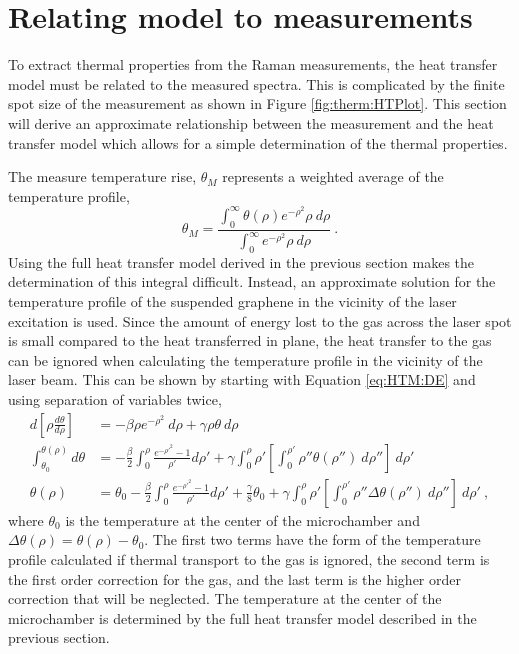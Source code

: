 \section{Relating model to measurements}
To extract thermal properties from the Raman measurements, the heat transfer model must be related to the measured spectra.
This is complicated by the finite spot size of the measurement as shown in Figure \ref{fig:therm:HTPlot}.
This section will derive an approximate relationship between the measurement and the heat transfer model which allows for a simple determination of the thermal properties.

The measure temperature rise, $\theta_M$ represents a weighted average of the temperature profile,
\begin{equation}
	\theta_M=\frac{\int_0^{\infty} \theta(\rho) e^{-\rho^2} \rho \ d \rho}{\int_0^{\infty} e^{-\rho^2} \rho \ d \rho} \ . \label{eq:HTM:average}
\end{equation}
Using the full heat transfer model derived in the previous section makes the determination of this integral difficult.
Instead, an approximate solution for the temperature profile of the suspended graphene in the vicinity of the laser excitation is used.
Since the amount of energy lost to the gas across the laser spot is small compared to the heat transferred in plane, the heat transfer to the gas can be ignored when calculating the temperature profile in the vicinity of the laser beam.
This can be shown by starting with Equation \ref{eq:HTM:DE} and using separation of variables twice,
\begin{align*}
	d \left[\rho \frac{d \theta}{d \rho} \right]&=-\beta \rho e^{-\rho^2} \ d \rho+\gamma \rho \theta \ d \rho \\
	\int_{\theta_0}^{\theta(\rho)} d \theta&=
		-\frac{\beta}{2} \int_0^{\rho}\frac{e^{-\rho'^2}-1}{\rho'} d \rho' + 
		\gamma \int_0^{\rho}\rho' \left[\int_{0}^{\rho'}\rho'' \theta(\rho'') \ d \rho''\right] \ d \rho' \\
	\theta(\rho)&=\theta_0-\frac{\beta}{2} \int_0^{\rho}\frac{e^{-\rho'^2}-1}{\rho'} d \rho'+
		\frac{\gamma}{8} \theta_0 +
		\gamma \int_0^{\rho}\rho' \left[\int_{0}^{\rho'}\rho'' \Delta \theta(\rho'') \ d \rho''\right] \ d \rho' \ ,
\end{align*}
where $\theta_0$ is the temperature at the center of the microchamber and $\Delta \theta(\rho)=\theta(\rho)-\theta_0$.
The first two terms have the form of the temperature profile calculated if thermal transport to the gas is ignored\cite{Faugeras2010}, the second term is the first order correction for the gas, and the last term is the higher order correction that will be neglected.
The temperature at the center of the microchamber is determined by the full heat transfer model described in the previous section.

